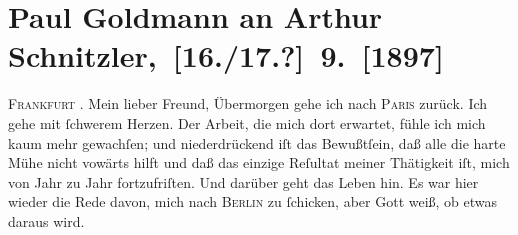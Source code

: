 

         
         \renewcommand{\erwaehntePersonen}{Personen: Berthold Frischauer, Paul Goldmann, Richard Klein, Arthur Klein, Johann Klein}
         \renewcommand{\erwaehnteOrte}{Orte: Berlin, Frankfurt am Main, Paris, Wien}
         \renewcommand{\erwaehnteWerke}{}
               \section[ Paul Goldmann an Arthur Schnitzler, {[}16./17.?{]} 9. {[}1897{]}]{ Paul Goldmann an Arthur Schnitzler, {[}16./17.?{]} 9. {[}1897{]}}\nopagebreak{}\rehead{ }\begin{ledgroupsized}[t]{13cm}\normalsize\beginnumbering{} \toendnotes[C]{\smallbreak\pagebreak[2]} 
\toendnotes[C]{\smallbreak}\pstart
           \raggedleft{}{\pb}\textsc{Frankfurt}{ }\label{K_L02824-1v}\label{K_L02824-1h}.\pend
           \pstart\center{}Mein lieber Freund,\pend\pstart
           Übermorgen gehe ich nach \textsc{Paris} zurück. Ich gehe mit ſchwerem Herzen. Der Arbeit, die mich dort erwartet, fühle
               ich mich kaum mehr gewachſen; und niederdrückend iſt das Bewußtſein, daß alle die
               harte Mühe nicht vowärts hilft und daß das einzige Reſultat meiner Thätigkeit iſt,
               mich von Jahr zu Jahr fortzufriſten. Und darüber geht das Leben  hin. Es war hier wieder die Rede davon, mich nach
                  \textsc{Berlin} zu ſchicken, aber Gott weiß, ob etwas daraus wird.\pend

\end{ledgroupsized}
